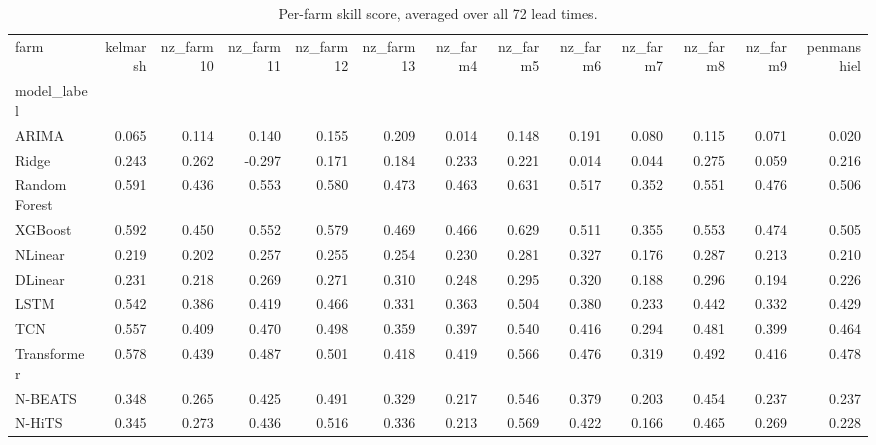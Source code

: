 \begin{table}[ht]
\caption{Per-farm skill score, averaged over all 72 lead times.}
\label{tab:app_per_farm_skill}
\begin{tabular}{lrrrrrrrrrrrr}
\toprule
farm & kelmarsh & nz_farm10 & nz_farm11 & nz_farm12 & nz_farm13 & nz_farm4 & nz_farm5 & nz_farm6 & nz_farm7 & nz_farm8 & nz_farm9 & penmanshiel \\
model_label &  &  &  &  &  &  &  &  &  &  &  &  \\
\midrule
ARIMA & 0.065 & 0.114 & 0.140 & 0.155 & 0.209 & 0.014 & 0.148 & 0.191 & 0.080 & 0.115 & 0.071 & 0.020 \\
Ridge & 0.243 & 0.262 & -0.297 & 0.171 & 0.184 & 0.233 & 0.221 & 0.014 & 0.044 & 0.275 & 0.059 & 0.216 \\
Random Forest & 0.591 & 0.436 & 0.553 & 0.580 & 0.473 & 0.463 & 0.631 & 0.517 & 0.352 & 0.551 & 0.476 & 0.506 \\
XGBoost & 0.592 & 0.450 & 0.552 & 0.579 & 0.469 & 0.466 & 0.629 & 0.511 & 0.355 & 0.553 & 0.474 & 0.505 \\
NLinear & 0.219 & 0.202 & 0.257 & 0.255 & 0.254 & 0.230 & 0.281 & 0.327 & 0.176 & 0.287 & 0.213 & 0.210 \\
DLinear & 0.231 & 0.218 & 0.269 & 0.271 & 0.310 & 0.248 & 0.295 & 0.320 & 0.188 & 0.296 & 0.194 & 0.226 \\
LSTM & 0.542 & 0.386 & 0.419 & 0.466 & 0.331 & 0.363 & 0.504 & 0.380 & 0.233 & 0.442 & 0.332 & 0.429 \\
TCN & 0.557 & 0.409 & 0.470 & 0.498 & 0.359 & 0.397 & 0.540 & 0.416 & 0.294 & 0.481 & 0.399 & 0.464 \\
Transformer & 0.578 & 0.439 & 0.487 & 0.501 & 0.418 & 0.419 & 0.566 & 0.476 & 0.319 & 0.492 & 0.416 & 0.478 \\
N-BEATS & 0.348 & 0.265 & 0.425 & 0.491 & 0.329 & 0.217 & 0.546 & 0.379 & 0.203 & 0.454 & 0.237 & 0.237 \\
N-HiTS & 0.345 & 0.273 & 0.436 & 0.516 & 0.336 & 0.213 & 0.569 & 0.422 & 0.166 & 0.465 & 0.269 & 0.228 \\
\bottomrule
\end{tabular}
\end{table}
